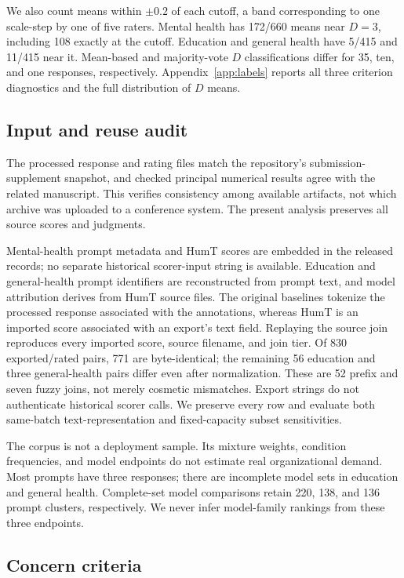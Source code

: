 \documentclass[manuscript,screen,review,anonymous]{acmart}
\begin{document}
We also count means within $\pm0.2$ of each cutoff, a band corresponding to one scale-step by one of five raters. Mental health has 172/660 means near $D=3$, including 108 exactly at the cutoff. Education and general health have 5/415 and 11/415 near it. Mean-based and majority-vote $D$ classifications differ for 35, ten, and one responses, respectively. Appendix~\ref{app:labels} reports all three criterion diagnostics and the full distribution of $D$ means.

\subsection{Input and reuse audit}
The processed response and rating files match the repository's submission-supplement snapshot, and checked principal numerical results agree with the related manuscript. This verifies consistency among available artifacts, not which archive was uploaded to a conference system. The present analysis preserves all source scores and judgments.

Mental-health prompt metadata and HumT scores are embedded in the released records; no separate historical scorer-input string is available. Education and general-health prompt identifiers are reconstructed from prompt text, and model attribution derives from HumT source files. The original baselines tokenize the processed response associated with the annotations, whereas HumT is an imported score associated with an export's text field. Replaying the source join reproduces every imported score, source filename, and join tier. Of 830 exported/rated pairs, 771 are byte-identical; the remaining 56 education and three general-health pairs differ even after normalization. These are 52 prefix and seven fuzzy joins, not merely cosmetic mismatches. Export strings do not authenticate historical scorer calls. We preserve every row and evaluate both same-batch text-representation and fixed-capacity subset sensitivities.

The corpus is not a deployment sample. Its mixture weights, condition frequencies, and model endpoints do not estimate real organizational demand. Most prompts have three responses; there are incomplete model sets in education and general health. Complete-set model comparisons retain 220, 138, and 136 prompt clusters, respectively. We never infer model-family rankings from these three endpoints.

\subsection{Concern criteria}
\end{document}
